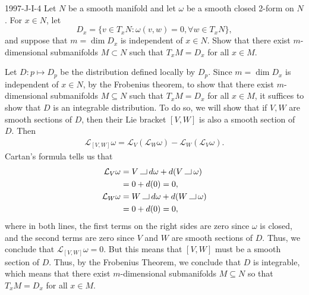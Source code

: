 \documentclass{article}
\newcommand{\contract}{\mathbin{\vrule height 0.4pt width 8pt depth 0pt\vrule height 6pt width 0.4pt depth 0pt}}
\begin{document}
	\begin{prb}{1997-J-I-4}
		Let $N$ be a smooth manifold and let $\omega$ be a smooth closed 2-form on $N$. For $x \in N$, let 
		\begin{equation*}
			D_{x} = \{v \in T_{x}N: \omega(v, w) = 0, \forall w \in T_{x}N\}, 
		\end{equation*}
		and suppose that $m = \dim{D_{x}}$ is independent of $x \in N$. Show that there exist $m$-dimensional submanifolds $M \subset N$ such that $T_{x}M = D_{x}$ for all $x \in M$. 
	\end{prb}
	Let $D: p \mapsto D_{p}$ be the distribution defined locally by $D_{p}$. Since $m = \dim{D_{x}}$ is independent of $x \in N$, by the Frobenius theorem, to show that there exist $m$-dimensional submanifolds $M \subseteq N$ such that $T_{x}M = D_{x}$ for all $x \in M$, it suffices to show that $D$ is an integrable distribution. To do so, we will show that if $V, W$ are smooth sections of $D$, then their Lie bracket $[V, W]$ is also a smooth section of $D$. Then 
	\begin{align*}
		\mathcal{L}_{[V,W]}\omega = \mathcal{L}_{V}(\mathcal{L}_{W}\omega) - \mathcal{L}_{W}(\mathcal{L}_{V}\omega). 
	\end{align*}
	Cartan's formula tells us that 
	\begin{align*}
		\begin{split}
			\mathcal{L}_{V}\omega &= V \contract d\omega + d(V \contract \omega) \\
			&= 0 + d(0) = 0, \\
			\mathcal{L}_{W}\omega &= W \contract d\omega + d(W \contract \omega) \\
			&= 0 + d(0) = 0, 
		\end{split}
	\end{align*}
	where in both lines, the first terms on the right sides are zero since $\omega$ is closed, and the second terms are zero since $V$ and $W$ are smooth sections of $D$. Thus, we conclude that $\mathcal{L}_{[V, W]}\omega = 0$. But this means that $[V, W]$ must be a smooth section of $D$. Thus, by the Frobenius Theorem, we conclude that $D$ is integrable, which means that there exist $m$-dimensional submanifolds $M \subseteq N$ so that $T_{x}M = D_{x}$ for all $x \in M$. 
	
\end{document}
